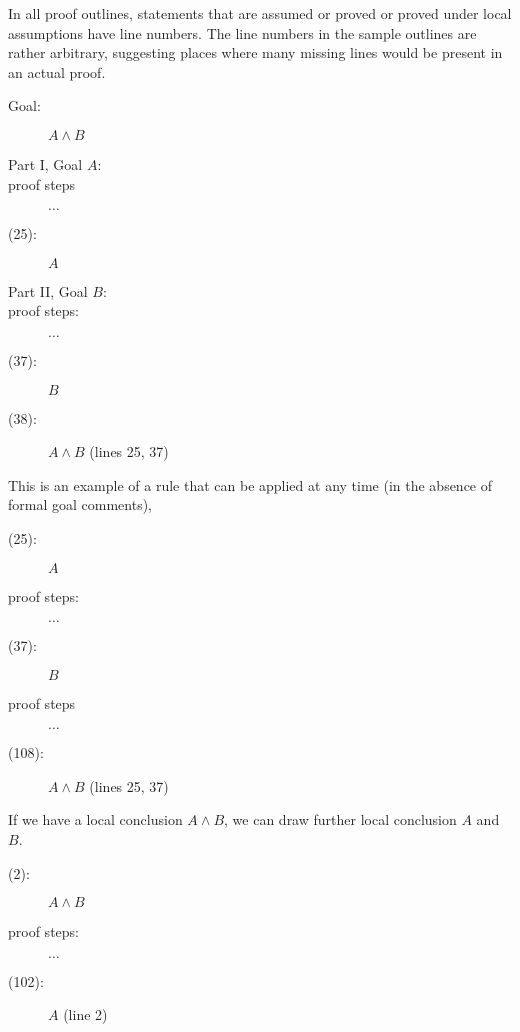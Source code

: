 \documentclass[12pt]{article}
\begin{document}
In all proof outlines, statements that are assumed or proved or proved under local assumptions have line numbers.  The line numbers
in the sample outlines are rather arbitrary, suggesting places where many missing lines would be present in an actual proof.

\begin{description}

\item[Goal:]  $A \wedge B$

\item[Part I, Goal $A$:]

\item[proof steps]  $\ldots$

\item[(25):]  $A$

\item[Part II,  Goal $B$:]

\item[proof steps:]  $\ldots$

\item[(37):]  $B$ 

\item[(38):]  $A \wedge B$ (lines 25, 37)

\end{description}

This is an example of a rule that can be applied at any time (in the absence of formal goal comments),

\begin{description}



\item[(25):]  $A$



\item[proof steps:]  $\ldots$

\item[(37):]  $B$ 

\item[proof steps] $\ldots$

\item[(108):]  $A \wedge B$ (lines 25, 37)

\end{description}

If we have a local conclusion $A \wedge B$, we can draw further local
conclusion $A$ and $B$.

\begin{description}

\item[(2):]  $A \wedge B$

\item[proof steps:]  $\ldots$

\item[(102):]  $A$ (line 2)

\end{description}
\end{document}
